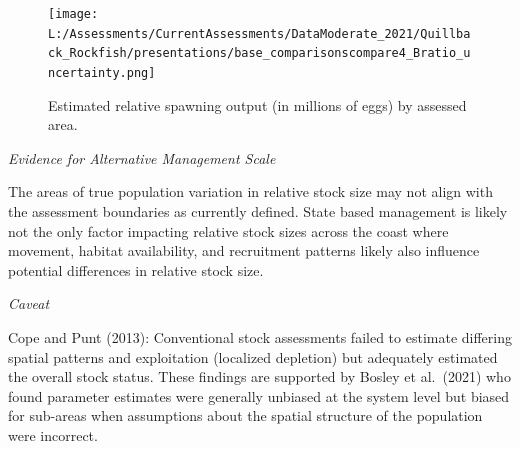 \documentclass[11pt,
  english,
  letterpaper,
]{article}
\begin{document}
\leavevmode\tagmcend\tagstructend\par


\begin{figure}
\centering
\texttt{[image: L:/Assessments/CurrentAssessments/DataModerate\_2021/Quillback\_Rockfish/presentations/base\_comparisonscompare4\_Bratio\_uncertainty.png]}
\caption{Estimated relative spawning output (in millions of eggs) by assessed area.\label{fig:relb-comparison}}
\end{figure}

\tagmcend\tagstructend

\clearpage


\emph{Evidence for Alternative Management Scale}

\leavevmode\tagmcend\tagstructend\par


The areas of true population variation in relative stock size may not align with the assessment boundaries as currently defined. State based management is likely not the only factor impacting relative stock sizes across the coast where movement, habitat availability, and recruitment patterns likely also influence potential differences in relative stock size.

\leavevmode\tagmcend\tagstructend\par


\emph{Caveat}

\leavevmode\tagmcend\tagstructend\par


Cope and Punt {(2013)\leavevmode\tagmcend\tagstructend}: Conventional stock assessments failed to estimate differing spatial patterns and exploitation (localized depletion) but adequately estimated the overall stock status. These findings are supported by Bosley et al.~{(2021)\leavevmode\tagmcend\tagstructend} who found parameter estimates were generally unbiased at the system level but biased for sub-areas when assumptions about the spatial structure of the population were incorrect.
\end{document}
